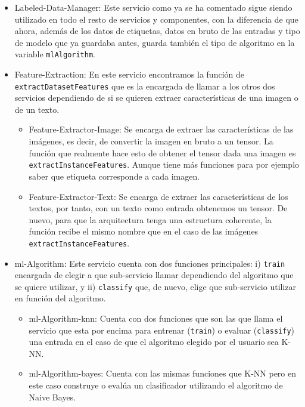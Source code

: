 \documentclass[a4paper, 12pt]{book}
\begin{document}
\begin{itemize}
 
	\item Labeled-Data-Manager: Este servicio como ya se ha comentado sigue siendo utilizado en todo el resto de servicios y componentes, con la diferencia de que ahora, además de los datos de etiquetas, datos en bruto de las entradas y tipo de modelo que ya guardaba antes, guarda también el tipo de algoritmo en la variable \texttt{mlAlgorithm}.
 
	\item Feature-Extraction: En este servicio encontramos la función de \texttt{extractDatasetFeatures} que es la encargada de llamar a los otros dos servicios dependiendo de si se quieren extraer características de una imagen o de un texto.
\begin{itemize}
 
	\item Feature-Extractor-Image: Se encarga de extraer las características de las imágenes, es decir, de convertir la imagen en bruto a un tensor. La función que realmente hace esto de obtener el tensor dada una imagen es \texttt{extractInstanceFeatures}. Aunque tiene más funciones para por ejemplo saber que etiqueta corresponde a cada imagen.

	\item Feature-Extractor-Text: Se encarga de extraer las características de los textos, por tanto, con un texto como entrada obtenemos un tensor. De nuevo, para que la arquitectura tenga una estructura coherente, la función recibe el mismo nombre que en el caso de las imágenes \texttt{extractInstanceFeatures}. 
\end{itemize}

	\item ml-Algorithm: Este servicio cuenta con dos funciones principales: i) \texttt{train} encargada de elegir a que sub-servicio llamar dependiendo del algoritmo que se quiere utilizar, y ii) \texttt{classify} que, de nuevo, elige que sub-servicio utilizar en función del algoritmo.
\begin{itemize}
 
	\item ml-Algorithm-knn: Cuenta con dos funciones que son las que llama el servicio que esta por encima para entrenar (\texttt{train}) o evaluar (\texttt{classify}) una entrada en el caso de que el algoritmo elegido por el usuario sea K-NN.

	\item ml-Algorithm-bayes: Cuenta con las mismas funciones que K-NN pero en este caso construye o evalúa un clasificador utilizando el algoritmo de Naive Bayes.
\end{itemize}


\end{itemize}
\end{document}
